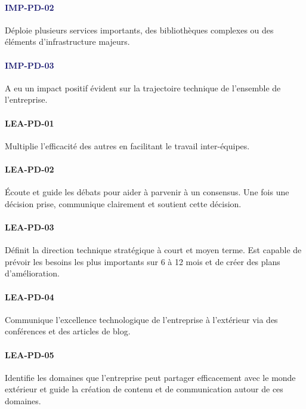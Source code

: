 \documentclass[a4paper, french, openany, 12pt]{book}
\newcommand\wis[1]{\textcolor{MidnightBlue}{\textbf{\uppercase{imp-{#1}}}}}
\newcommand\cha[1]{\textcolor{OliveGreen}{\textbf{\uppercase{lea-{#1}}}}}
\begin{document}
\begin{multicols}{2}
  \paragraph*{\wis{pd-02}}

  Déploie plusieurs services importants, des bibliothèques complexes ou des éléments d'infrastructure majeurs.

  \paragraph*{\wis{pd-03}}

  A eu un impact positif évident sur la trajectoire technique de l'ensemble de l'entreprise.

  \paragraph*{\cha{pd-01}}

  Multiplie l'efficacité des autres en facilitant le travail inter-équipes.

  \paragraph*{\cha{pd-02}}

  Écoute et guide les débats pour aider à parvenir à un consensus.
  Une fois une décision prise, communique clairement et soutient cette décision.

  \paragraph*{\cha{pd-03}}

  Définit la direction technique stratégique à court et moyen terme.
  Est capable de prévoir les besoins les plus importants  sur 6 à 12 mois et de créer des plans d'amélioration.

  \paragraph*{\cha{pd-04}}

  Communique l'excellence technologique de l'entreprise à l'extérieur via des conférences et des articles de blog. 
  
  \paragraph*{\cha{pd-05}}

  Identifie les domaines que l'entreprise peut partager efficacement avec le monde extérieur et guide la création de 
  contenu et de communication autour de ces domaines.


\end{multicols}
\end{document}
